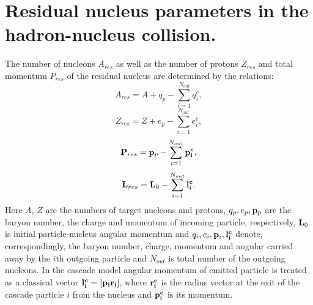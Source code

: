 \section{Residual nucleus parameters in the hadron-nucleus 
collision.}

\hspace{1.0em}
The number of nucleons $A_{res}$ as well as the number of protons
$Z_{res}$ and total momentum $P_{res}$ of the residual nucleus are
determined by the relations:
\begin{equation}
\label{FR1}A_{res}=A+q _p-\sum_{i=1}^{N_{out}}q_i^c, 
\end{equation}
\begin{equation}
\label{FR2}Z_{res}=Z+e_p-\sum_{i=1}^{N_{out}}e_i^c, 
\end{equation}
\begin{equation}
\label{FR3}{\bf P}_{res}={\bf p}_p-\sum_{i=1}^{N_{out}}{\bf p_i^c}, 
\end{equation}
\begin{equation}
\label{FR4}{\bf L}_{res}={\bf L}_0-\sum_{i=1}^{N_{out}}{\bf l_i^c}. 
\end{equation}
Here $A$, $Z$ are the numbers of target nucleons and protons, 
$q_p,e_p,{\bf p}_p$ are the baryon number, the charge and momentum of incoming 
particle, respectively, ${\bf L}_0$ is initial particle-nucleus 
angular momentum and 
$q_i,e_i,{\bf p}_i,{\bf l_i^c}$  denote, correspondingly, the baryon number, 
charge,
momentum and angular carried away by the $i$th 
outgoing particle and $N_{out}$ is 
total number of the outgoing nucleons.
In the cascade model angular momentum of emitted particle is treated as a 
classical vector 
${\bf l_i^c} = [{\bf p_ir_i}]$, where ${\bf r_i^c}$ is the radius vector at the exit of the
cascade particle $i$ from the nucleus and ${\bf p_i^c}$ is its momentum.
